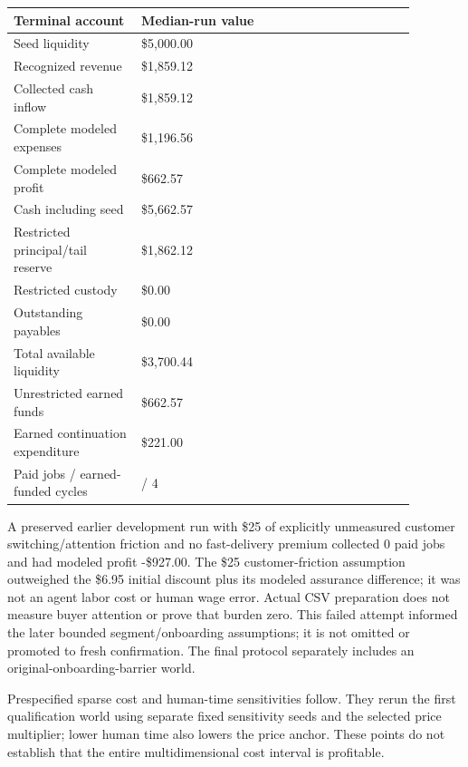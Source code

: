 \documentclass[10pt,letterpaper]{article}
\begin{document}
\begin{longtable}{>{\raggedright\arraybackslash}p{0.280\linewidth}>{\raggedright\arraybackslash}p{0.600\linewidth}}
\toprule
\textbf{Terminal account} & \textbf{Median-run value}\\
\midrule
\endhead
Seed liquidity & \$5,000.00\\
Recognized revenue & \$1,859.12\\
Collected cash inflow & \$1,859.12\\
Complete modeled expenses & \$1,196.56\\
Complete modeled profit & \$662.57\\
Cash including seed & \$5,662.57\\
Restricted principal/tail reserve & \$1,862.12\\
Restricted custody & \$0.00\\
Outstanding payables & \$0.00\\
Total available liquidity & \$3,700.44\\
Unrestricted earned funds & \$662.57\\
Earned continuation expenditure & \$221.00\\
Paid jobs / earned-funded cycles & 15 / 4\\
\bottomrule
\end{longtable}
A preserved earlier development run with \$25 of explicitly unmeasured customer switching/attention friction and no fast-delivery premium collected 0 paid jobs and had modeled profit -\$927.00. The \$25 customer-friction assumption outweighed the \$6.95 initial discount plus its modeled assurance difference; it was not an agent labor cost or human wage error. Actual CSV preparation does not measure buyer attention or prove that burden zero. This failed attempt informed the later bounded segment/onboarding assumptions; it is not omitted or promoted to fresh confirmation. The final protocol separately includes an original-onboarding-barrier world.

Prespecified sparse cost and human-time sensitivities follow. They rerun the first qualification world using separate fixed sensitivity seeds and the selected price multiplier; lower human time also lowers the price anchor. These points do not establish that the entire multidimensional cost interval is profitable.
\end{document}
